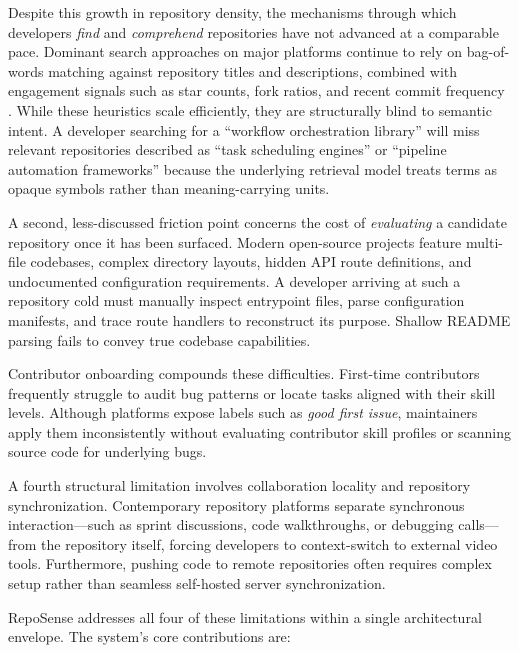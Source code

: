 \documentclass[journal]{IEEEtran}
\begin{document}
Despite this growth in repository density, the mechanisms through which developers \textit{find} and \textit{comprehend} repositories have not advanced at a comparable pace. Dominant search approaches on major platforms continue to rely on bag-of-words matching against repository titles and descriptions, combined with engagement signals such as star counts, fork ratios, and recent commit frequency \cite{dang2024legion}. While these heuristics scale efficiently, they are structurally blind to semantic intent. A developer searching for a ``workflow orchestration library'' will miss relevant repositories described as ``task scheduling engines'' or ``pipeline automation frameworks'' because the underlying retrieval model treats terms as opaque symbols rather than meaning-carrying units.

A second, less-discussed friction point concerns the cost of \textit{evaluating} a candidate repository once it has been surfaced. Modern open-source projects feature multi-file codebases, complex directory layouts, hidden API route definitions, and undocumented configuration requirements. A developer arriving at such a repository cold must manually inspect entrypoint files, parse configuration manifests, and trace route handlers to reconstruct its purpose. Shallow README parsing fails to convey true codebase capabilities.

Contributor onboarding compounds these difficulties. First-time contributors frequently struggle to audit bug patterns or locate tasks aligned with their skill levels. Although platforms expose labels such as \textit{good first issue}, maintainers apply them inconsistently without evaluating contributor skill profiles or scanning source code for underlying bugs.

A fourth structural limitation involves collaboration locality and repository synchronization. Contemporary repository platforms separate synchronous interaction—such as sprint discussions, code walkthroughs, or debugging calls—from the repository itself, forcing developers to context-switch to external video tools. Furthermore, pushing code to remote repositories often requires complex setup rather than seamless self-hosted server synchronization.

RepoSense addresses all four of these limitations within a single architectural envelope. The system's core contributions are:
\end{document}
